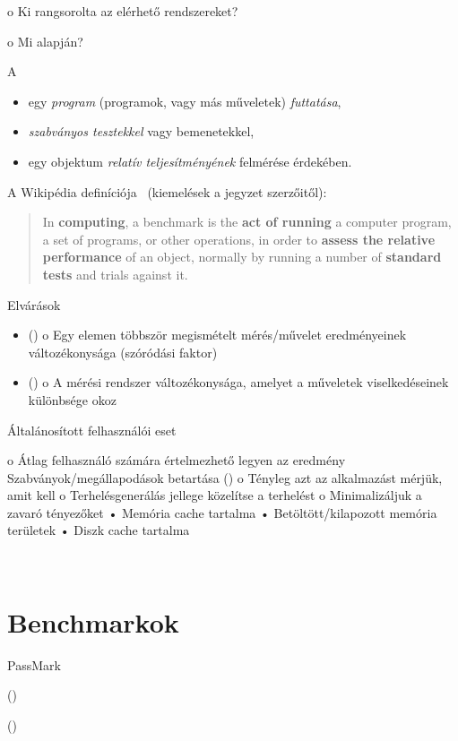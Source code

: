 o Ki rangsorolta az elérhető rendszereket?

o Mi alapján?

\begin{definicio}
	A 
	\begin{itemize}
		\item egy \emph{program} (programok, vagy más műveletek) \emph{futtatása},
		\item \emph{szabványos tesztekkel} vagy bemenetekkel,
		\item egy objektum \emph{relatív teljesítményének} felmérése érdekében.
	\end{itemize}
\end{definicio}

A Wikipédia definíciója~\cite{wiki:benchmark} (kiemelések a jegyzet szerzőitől):

\begin{quote}
	In \textbf{computing}, a benchmark is the \textbf{act of running} a computer program, a set of programs, or other operations, in order to \textbf{assess the relative performance} of an object, normally by running a number of \textbf{standard tests} and trials against it.
\end{quote}

Elvárások

\begin{itemize}
	\item {} ()
	o Egy elemen többször megismételt mérés/művelet eredményeinek változékonysága (szóródási faktor)
	\item {} ()
	o A mérési rendszer változékonysága, amelyet a műveletek viselkedéseinek különbsége okoz
\end{itemize}

Általánosított felhasználói eset

o Átlag felhasználó számára értelmezhető legyen az
eredmény
Szabványok/megállapodások betartása
 ()
o Tényleg azt az alkalmazást mérjük, amit kell
o Terhelésgenerálás jellege közelítse a  terhelést
o Minimalizáljuk a zavaró tényezőket
• Memória cache tartalma
• Betöltött/kilapozott memória területek
• Diszk cache tartalma

~\cite{DBLP:books/mk/Gray93}


\section{Benchmarkok\kieg}

PassMark

 ()

 ()


